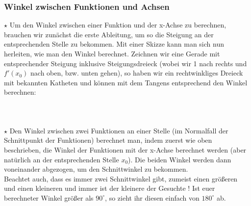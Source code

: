 	\subsubsection{Winkel zwischen Funktionen und Achsen}
		\(\star\) Um den Winkel zwischen einer Funktion und der x-Achse zu berechnen,
		brauchen wir zunächst die erste Ableitung, um so die Steigung an der
		entsprechenden Stelle zu bekommen. Mit einer Skizze kann man sich nun
		herleiten, wie man den Winkel berechnet. Zeichnen wir eine Gerade mit
		entsprechender Steigung inklusive Steigungsdreieck (wobei wir 1 nach rechts
		und \(f'(x_0)\) nach oben, bzw. unten gehen), so haben wir ein rechtwinkliges
		Dreieck mit bekannten Katheten und können mit dem Tangens entsprechend den
		Winkel berechnen:
		\\ \\
		\formel{\[\alpha = tan^{-1}(f'(x_0))\]}
		\\ \\
		\(\star\) Den Winkel zwischen zwei Funktionen an einer Stelle (im Normalfall
		der Schnittpunkt der Funktionen) berechnet man, indem zuerst wie oben
		beschrieben, die Winkel der Funktionen mit der x-Achse berechnet werden (aber
		natürlich an der entsprechenden Stelle \(x_0\)). Die beiden Winkel werden dann
		voneinander abgezogen, um den Schnittwinkel zu bekommen.\\
		Beachtet auch, dass es immer zwei Schnittwinkel gibt, zumeist einen größeren
		und einen kleineren und immer ist  der kleinere der Gesuchte ! Ist euer
		berechneter Winkel größer als \(90^\circ\), so zieht ihr diesen einfach von
		\(180^\circ\) ab.
		
		
